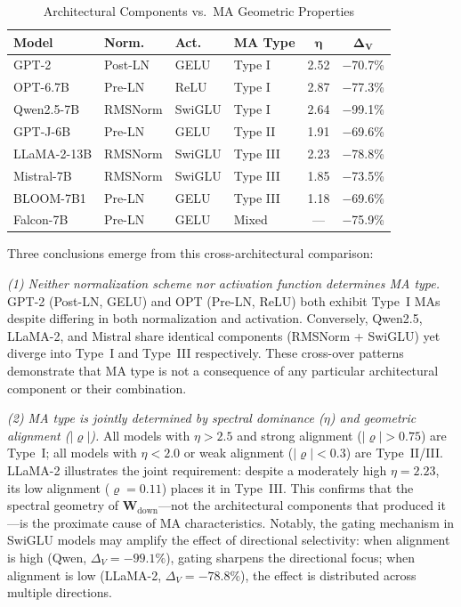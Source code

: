 \documentclass[conference]{IEEEtran}
\begin{document}
\begin{table}[htbp]
\centering
\caption{Architectural Components vs.\ MA Geometric Properties}
\label{tab:arch_components}
\footnotesize
\begin{tabular}{@{}llllcc@{}}
\toprule
\textbf{Model} & \textbf{Norm.} & \textbf{Act.} & \textbf{MA Type} & $\boldsymbol{\eta}$ & $\boldsymbol{\Delta_V}$ \\
\midrule
GPT-2      & Post-LN    & GELU    & Type I   & 2.52 & $-$70.7\% \\
OPT-6.7B   & Pre-LN     & ReLU    & Type I   & 2.87 & $-$77.3\% \\
Qwen2.5-7B & RMSNorm    & SwiGLU  & Type I   & 2.64 & $-$99.1\% \\
GPT-J-6B   & Pre-LN     & GELU    & Type II  & 1.91 & $-$69.6\% \\
LLaMA-2-13B& RMSNorm    & SwiGLU  & Type III & 2.23 & $-$78.8\% \\
Mistral-7B & RMSNorm    & SwiGLU  & Type III & 1.85 & $-$73.5\% \\
BLOOM-7B1  & Pre-LN     & GELU    & Type III & 1.18 & $-$69.6\% \\
Falcon-7B  & Pre-LN     & GELU    & Mixed    & ---  & $-$75.9\% \\
\bottomrule
\end{tabular}
\end{table}

Three conclusions emerge from this cross-architectural comparison:

\textit{(1) Neither normalization scheme nor activation function determines MA type.}
GPT-2 (Post-LN, GELU) and OPT (Pre-LN, ReLU) both exhibit Type~I MAs despite differing in both normalization and activation. Conversely, Qwen2.5, LLaMA-2, and Mistral share identical components (RMSNorm + SwiGLU) yet diverge into Type~I and Type~III respectively. These cross-over patterns demonstrate that MA type is not a consequence of any particular architectural component or their combination.

\textit{(2) MA type is jointly determined by spectral dominance ($\eta$) and geometric alignment ($|\varrho|$).}
All models with $\eta > 2.5$ and strong alignment ($|\varrho| > 0.75$) are Type~I; all models with $\eta < 2.0$ or weak alignment ($|\varrho| < 0.3$) are Type~II/III. LLaMA-2 illustrates the joint requirement: despite a moderately high $\eta = 2.23$, its low alignment ($\varrho = 0.11$) places it in Type~III. This confirms that the spectral geometry of $\mathbf{W}_{\text{down}}$---not the architectural components that produced it---is the proximate cause of MA characteristics. Notably, the gating mechanism in SwiGLU models may amplify the effect of directional selectivity: when alignment is high (Qwen, $\Delta_V = -99.1\%$), gating sharpens the directional focus; when alignment is low (LLaMA-2, $\Delta_V = -78.8\%$), the effect is distributed across multiple directions.
\end{document}
